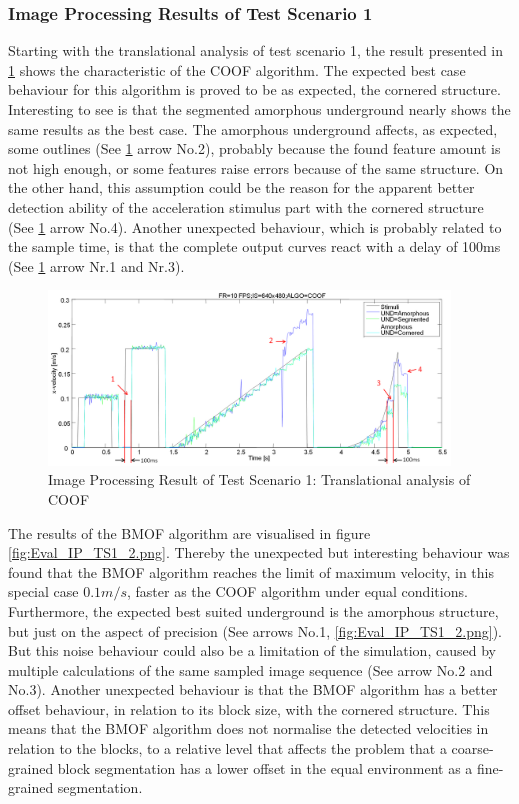 \subsubsection{Image Processing Results of Test Scenario 1}
Starting with the translational analysis of test scenario 1, the result presented in \ref{fig:Eval_IP_TS1_1.png} shows the characteristic of the \gls{COOF} algorithm. The expected best case behaviour for this algorithm is proved to be as expected, the cornered structure. Interesting to see is that the segmented amorphous underground nearly shows the same results as the best case. The amorphous underground affects, as expected, some outlines (See \ref{fig:Eval_IP_TS1_1.png} arrow No.2), probably because the found feature amount is not high enough, or some features raise errors because of the same structure. On the other hand, this assumption could be the reason for the apparent better detection ability of the acceleration stimulus part with the cornered structure (See \ref{fig:Eval_IP_TS1_1.png} arrow No.4). Another unexpected behaviour, which is probably related to the sample time, is that the complete output curves react with a delay of 100ms 
(See \ref{fig:Eval_IP_TS1_1.png} arrow Nr.1 and Nr.3).          

\begin{figure}[H]
	\centering
		\includegraphics[width=0.95\textwidth]{graphic/Eval_IP_TS1_1.png}
	\caption{Image Processing Result of Test Scenario 1: Translational analysis of COOF}
	\label{fig:Eval_IP_TS1_1.png}
\end{figure}

The results of the \gls{BMOF} algorithm are visualised in figure \ref{fig:Eval_IP_TS1_2.png}. Thereby the unexpected but interesting behaviour was found that the \gls{BMOF} algorithm reaches the limit of maximum velocity, in this special case \ensuremath{0.1 m/s}, faster as the \gls{COOF} algorithm under equal conditions. Furthermore, the expected best suited underground is the amorphous structure, but just on the aspect of precision (See arrows No.1, \ref{fig:Eval_IP_TS1_2.png}). But this noise behaviour could also be a limitation of the simulation, caused by multiple calculations of the same sampled image sequence (See arrow No.2 and No.3). Another unexpected behaviour is that the \gls{BMOF} algorithm has a better offset behaviour, in relation to its block size, with the cornered structure.
This means that the \gls{BMOF} algorithm does not normalise the detected velocities in relation to the blocks, to a relative level that affects the problem that a coarse-grained block segmentation has a lower offset in the equal environment as a fine-grained segmentation.

